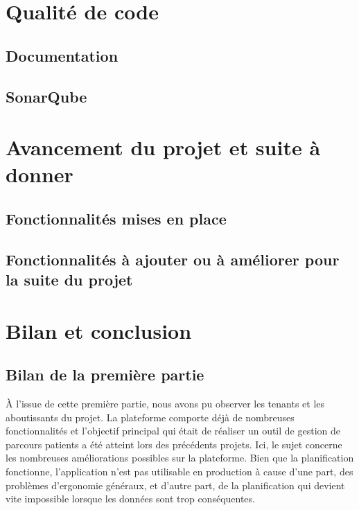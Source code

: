 \documentclass[noposter]{polytech/polytech}
\begin{document}
\chapter{Qualité de code}


\section{Documentation}


\section{SonarQube}



\chapter{Avancement du projet et suite à donner}


\section{Fonctionnalités mises en place}


\section{Fonctionnalités à ajouter ou à améliorer pour la suite du projet}



\chapter*{Bilan et conclusion}

\section*{Bilan de la première partie}

À l'issue de cette première partie, nous avons pu observer les tenants et les aboutissants du projet. La plateforme comporte déjà de nombreuses fonctionnalités et l'objectif principal qui était de réaliser un outil de gestion de parcours patients a été atteint lors des précédents projets. Ici, le sujet concerne les nombreuses améliorations possibles sur la plateforme. Bien que la planification fonctionne, l'application n'est pas utilisable en production à cause d'une part, des problèmes d'ergonomie généraux, et d'autre part, de la planification qui devient vite impossible lorsque les données sont trop conséquentes.
\end{document}
